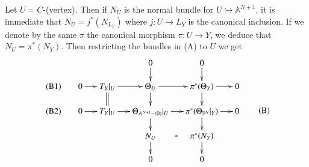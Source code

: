 {Let $U=C$-(vertex). Then if $N_{U}$ is the normal bundle for
$U\hookrightarrow \mathbb{A}^{N+1}$, it is immediate that
$N_{U}=j^{\ast}(N_{L_{Y}})$ where $j:U\to L_{Y}$ is the canonical
inclusion. If we denote by the same $\pi$ the canonical morphism
$\pi:U\to Y$, we deduce that $N_{U}=\pi^{\ast}(N_{Y})$. Then
restricting the bundles in (A) to $U$ we get 
\begin{equation*}
\vcenter{
\xymatrix@=.5cm{
 & & & 0\ar[d] & 0\ar[d] & \\
{\rm(B1)} & 0\ar[r] & T_{Y}|_{U}\ar@{=}[d]\ar[r] & \Theta_{U}\ar[d]\ar[r] &
  \pi^{\ast}(\Theta_{Y})\ar[d]\ar[r] & 0\\
{\rm(B2)} & 0\ar[r] & T_{Y}|_{U}\ar[r] &
  \Theta_{\mathbb{A}^{N+1}-(0)}|_{U}\ar[d]\ar[r] &
  \pi^{\ast}(\Theta_{\mathbb{P}^{N}}|_{Y})\ar[d]\ar[r] & 0\\
 & & & N_{U}\ar[d]\ar@{}[r]|{\simeq} & \pi^{\ast}(N_{Y})\ar[d] & \\
 & & & 0 & 0 &
}}\tag{B}
\end{equation*}\pageoriginale

}

